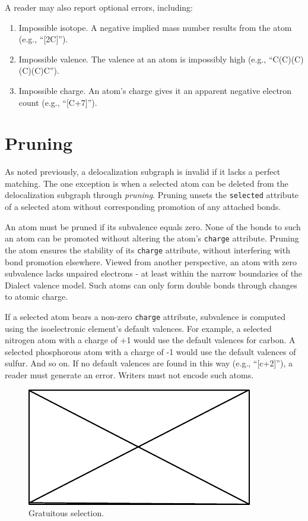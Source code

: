 \documentclass{article}
\def\ttt{\texttt}
\begin{document}
A reader may also report optional errors, including:

\begin{enumerate}
    \item{Impossible isotope. A negative implied mass number results from the atom (e.g., \enquote{[2C]}).}
    \item{Impossible valence. The valence at an atom is impossibly high (e.g., \enquote{C(C)(C)(C)(C)C}).}
    \item{Impossible charge. An atom's charge gives it an apparent negative electron count (e.g., \enquote{[C+7]}).}
\end{enumerate}

\section*{Pruning}

As noted previously, a delocalization subgraph is invalid if it lacks a perfect matching. The one exception is when a selected atom can be deleted from the delocalization subgraph through \textit{pruning}. Pruning unsets the \ttt{selected} attribute of a selected atom without corresponding promotion of any attached bonds.

An atom must be pruned if its subvalence equals zero. None of the bonds to such an atom can be promoted without altering the atom's \ttt{charge} attribute. Pruning the atom ensures the stability of its \ttt{charge} attribute, without interfering with bond promotion elsewhere. Viewed from another perspective, an atom with zero subvalence lacks unpaired electrons - at least within the narrow boundaries of the Dialect valence model. Such atoms can only form double bonds through changes to atomic charge. 

If a selected atom bears a non-zero \ttt{charge} attribute, subvalence is computed using the isoelectronic element's default valences. For example, a selected nitrogen atom with a charge of +1 would use the default valences for carbon. A selected phosphorous atom with a charge of -1 would use the default valences of sulfur. And so on. If no default valences are found in this way (e.g., \enquote{[c+2]}), a reader must generate an error. Writers must not encode such atoms.

\begin{figure}
    \centering
    \includegraphics{filler}
    \caption{Gratuitous selection.}
    \label{fig:gratuitous-selection}
\end{figure}
\end{document}
